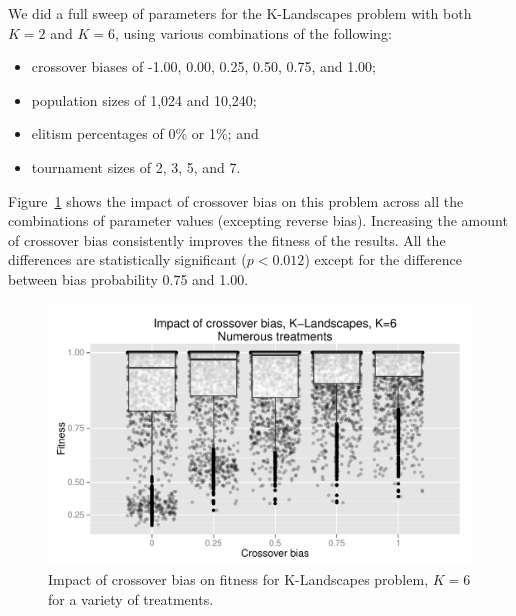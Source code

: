 \documentclass{sig-alternate}
\begin{document}
We did a full sweep of parameters for the K-Landscapes problem with both $K=2$ and $K=6$, using various combinations of the following:

\begin{itemize}
	\item crossover biases of -1.00, 0.00, 0.25, 0.50, 0.75, and 1.00;
	\item population sizes of 1,024 and 10,240;
	\item elitism percentages of 0\% or 1\%; and
	\item tournament sizes of 2, 3, 5, and 7.
\end{itemize}

Figure~\ref{fig:KLandscapes6_results} shows the impact of crossover bias on this problem across all the combinations of
parameter values (excepting reverse bias). Increasing the amount of crossover bias consistently improves the fitness of
the results. All the differences are statistically significant ($p < 0.012$) except for the difference between bias
probability 0.75 and 1.00.

%
%
%
%

\begin{figure}
\centering
\includegraphics[width=0.45 \textwidth]{Plots/KLandscapes6_XO_bias_impact_transformed_boxplot_alpha075.pdf}
\caption{Impact of crossover bias on fitness for K-Landscapes problem, $K=6$ for a variety of treatments.}
\label{fig:KLandscapes6_results}
\end{figure}
\end{document}
